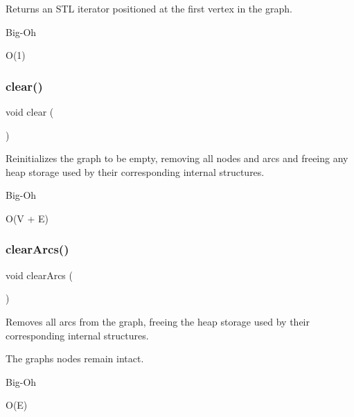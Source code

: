 Returns an S\+TL iterator positioned at the first vertex in the graph. 

\begin{DoxyRefDesc}{Big-\/\+Oh}
\item[\mbox{\hyperlink{BigOh__BigOh000091}{Big-\/\+Oh}}]O(1) \end{DoxyRefDesc}
\mbox{\label{classGraph_ac8bb3912a3ce86b15842e79d0b421204}} 
\subsubsection{\texorpdfstring{clear()}{clear()}}
{\footnotesize\ttfamily void clear (\begin{DoxyParamCaption}{ }\end{DoxyParamCaption})\hspace{0.3cm}{\ttfamily [inherited]}}



Reinitializes the graph to be empty, removing all nodes and arcs and freeing any heap storage used by their corresponding internal structures. 

\begin{DoxyRefDesc}{Big-\/\+Oh}
\item[\mbox{\hyperlink{BigOh__BigOh000049}{Big-\/\+Oh}}]O(V + E) \end{DoxyRefDesc}
\mbox{\label{classGraph_a63f0ce1806df1c8070d997153363eecb}} 
\subsubsection{\texorpdfstring{clear\+Arcs()}{clearArcs()}\hspace{0.1cm}{\footnotesize\ttfamily [1/3]}}
{\footnotesize\ttfamily void clear\+Arcs (\begin{DoxyParamCaption}{ }\end{DoxyParamCaption})\hspace{0.3cm}{\ttfamily [inherited]}}



Removes all arcs from the graph, freeing the heap storage used by their corresponding internal structures. 

The graph\textquotesingle{}s nodes remain intact. \begin{DoxyRefDesc}{Big-\/\+Oh}
\item[\mbox{\hyperlink{BigOh__BigOh000050}{Big-\/\+Oh}}]O(\+E) \end{DoxyRefDesc}
\mbox{\label{classGraph_a14def9e68896088fec7839e5da4fed27}} 

